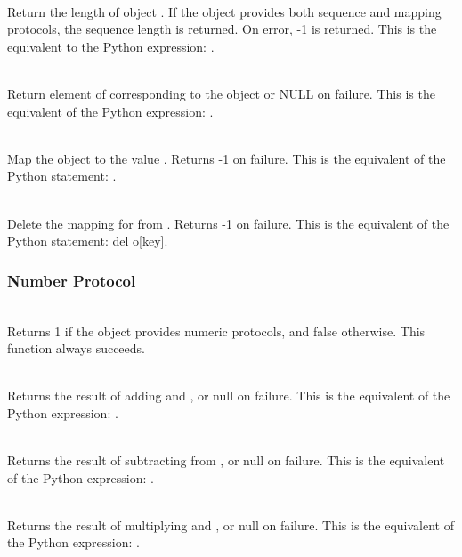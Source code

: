      \\
         Return the length of object .  If the object  provides
	 both sequence and mapping protocols, the sequence length is
	 returned. On error, -1 is returned.  This is the equivalent
	 to the Python expression: .


     \\
	 Return element of  corresponding to the object  or NULL
	 on failure. This is the equivalent of the Python expression:
	 .


     \\
	 Map the object  to the value .
	 Returns -1 on failure.  This is the equivalent
	 of the Python statement: .


     \\
	 Delete the mapping for  from .  Returns -1
	 on failure.
	 This is the equivalent of the Python statement: del o[key].


\subsubsection{Number Protocol}

     \\
         Returns 1 if the object  provides numeric protocols, and
	 false otherwise. 
	 This function always succeeds.


     \\
	 Returns the result of adding  and , or null on failure.
	 This is the equivalent of the Python expression: .


     \\
	 Returns the result of subtracting  from , or null on
	 failure.  This is the equivalent of the Python expression:
	 .


     \\
	 Returns the result of multiplying  and , or null on
	 failure.  This is the equivalent of the Python expression:
	 .


